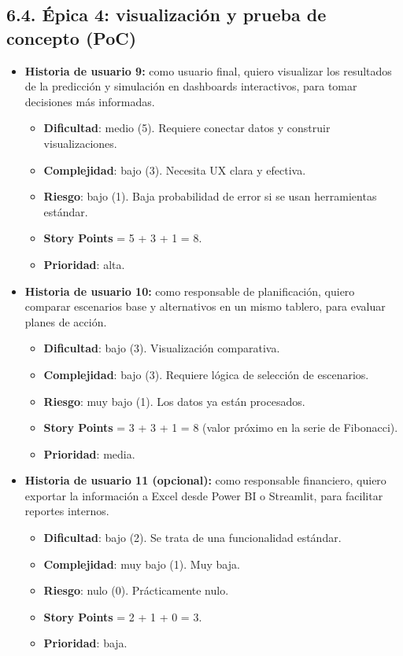 \documentclass[
11pt, %
]{charter}
\begin{document}
\subsection*{6.4. Épica 4: visualización y prueba de concepto (PoC)}
\begin{itemize}
  \item \textbf{Historia de usuario 9:} como usuario final, quiero visualizar los resultados de la predicción y simulación en dashboards interactivos, para tomar decisiones más informadas.
    \begin{itemize}
      \item \textbf{Dificultad}: medio (5). Requiere conectar datos y construir visualizaciones.
      \item \textbf{Complejidad}: bajo (3). Necesita UX clara y efectiva.
      \item \textbf{Riesgo}: bajo (1). Baja probabilidad de error si se usan herramientas estándar.
      \item \textbf{Story Points} = 5 + 3 + 1 = 8.
      \item \textbf{Prioridad}: alta.
    \end{itemize}
  \item \textbf{Historia de usuario 10:} como responsable de planificación, quiero comparar escenarios base y alternativos en un mismo tablero, para evaluar planes de acción.
    \begin{itemize}
      \item \textbf{Dificultad}: bajo (3). Visualización comparativa.
      \item \textbf{Complejidad}: bajo (3). Requiere lógica de selección de escenarios.
      \item \textbf{Riesgo}: muy bajo (1). Los datos ya están procesados.
      \item \textbf{Story Points} = 3 + 3 + 1 = 8 (valor próximo en la serie de Fibonacci).
      \item \textbf{Prioridad}: media.
    \end{itemize}
  \item \textbf{Historia de usuario 11 (opcional):} como responsable financiero, quiero exportar la información a Excel desde Power BI o Streamlit, para facilitar reportes internos.
    \begin{itemize}
      \item \textbf{Dificultad}: bajo (2). Se trata de una funcionalidad estándar.
      \item \textbf{Complejidad}: muy bajo (1). Muy baja.
      \item \textbf{Riesgo}: nulo (0). Prácticamente nulo.
      \item \textbf{Story Points} = 2 + 1 + 0 = 3.
      \item \textbf{Prioridad}: baja.
    \end{itemize}
\end{itemize}
\end{document}
